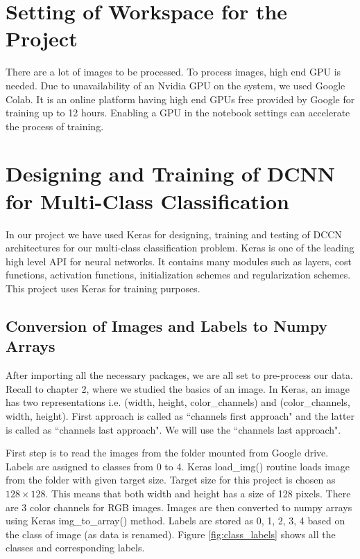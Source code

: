 \section{Setting of Workspace for the Project}
There are a lot of images to be processed. To process images, high end GPU is
needed. Due to unavailability of an Nvidia GPU on the system, we used Google Colab.
It is an online platform having high end GPUs free provided by Google for training
up to 12 hours. Enabling a GPU in the notebook settings can accelerate the process of
training.
\section{Designing and Training of DCNN for Multi-Class Classification}
In our project we have used Keras for designing, training and testing of 
DCCN architectures for our multi-class classification problem.
Keras is one of the leading high level API for neural networks. It contains
many modules such as layers, cost functions, activation functions, initialization
schemes and regularization schemes. This project uses Keras for training purposes.
\subsection{Conversion of Images and Labels to Numpy Arrays}
After importing all the necessary packages, we are all set to pre-process our data.
Recall to chapter 2, where we studied the basics of an image. In Keras, an image has two
representations i.e. (width, height, color\_channels) and (color\_channels, width, height).
First approach is called as ``channels first approach" and
the latter is called as ``channels last approach".
We will use the ``channels last approach".

First step is to read the images from the folder mounted from Google drive.
Labels are assigned to classes from 0 to 4. Keras load\_img() routine loads image
from the folder with given target size. Target size for this project is chosen as
$128 \times 128$. This means that both width and height has a size of 128 pixels.
There are 3 color channels for RGB images. Images are then converted to numpy arrays using
Keras img\_to\_array() method. Labels are stored as 0, 1, 2, 3, 4 based on the class of image (as data is renamed).
Figure \ref{fig:class_labels} shows all the classes and corresponding labels.

